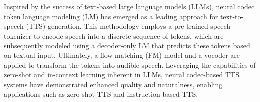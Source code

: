 \documentclass[a4paper]{article}
\begin{document}



Inspired by the success of text-based large language models (LLMs), neural codec token language modeling (LM) has emerged as a leading approach for text-to-speech (TTS) generation. This methodology employs a pre-trained speech tokenizer to encode speech into a discrete sequence of tokens, which are subsequently modeled using a decoder-only LM that predicts these tokens based on textual input. Ultimately, a flow matching (FM)\cite{NEURIPS2020_4c5bcfec} model and a vocoder are applied to transform the tokens into audible speech. Leveraging the capabilities of zero-shot and in-context learning inherent in LLMs, neural codec-based TTS systems \cite{lmtts1, lmtts2} have demonstrated enhanced quality and naturalness, enabling applications such as zero-shot TTS and instruction-based TTS.
\end{document}
